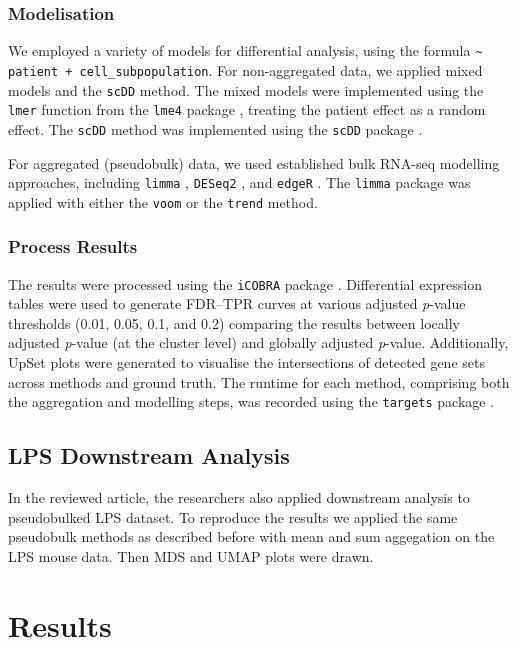 \documentclass[a4paper, 11pt, twocolumn]{article}
\begin{document}
\begin{multicols}{2}
\subsubsection{Modelisation}

We employed a variety of models for differential analysis, using the formula \texttt{\textasciitilde{} patient + cell\_subpopulation}. For non-aggregated data, we applied mixed models and the \texttt{scDD} method. The mixed models were implemented using the \texttt{lmer} function from the \texttt{lme4} package \citep{lme4}, treating the patient effect as a random effect. The \texttt{scDD} method was implemented using the \texttt{scDD} package \citep{scdd}.

For aggregated (pseudobulk) data, we used established bulk RNA-seq modelling approaches, including \texttt{limma} \citep{limma}, \texttt{DESeq2} \citep{deseq2}, and \texttt{edgeR} \citep{edger}. The \texttt{limma} package was applied with either the \texttt{voom} or the \texttt{trend} method.

\subsubsection{Process Results}

The results were processed using the \texttt{iCOBRA} package \citep{icobra}. Differential expression tables were used to generate FDR–TPR curves at various adjusted \textit{p}-value thresholds (0.01, 0.05, 0.1, and 0.2) comparing the results between locally adjusted \textit{p}-value (at the cluster level) and globally adjusted \textit{p}-value. Additionally, UpSet plots were generated to visualise the intersections of detected gene sets across methods and ground truth. The runtime for each method, comprising both the aggregation and modelling steps, was recorded using the \texttt{targets} package \citep{targets}.

\subsection{LPS Downstream Analysis}

In the reviewed article, the researchers also applied downstream analysis to pseudobulked LPS dataset. To reproduce the results we applied the same pseudobulk methods as described before with mean and sum aggegation on the LPS mouse data. Then MDS and UMAP plots were drawn.
\section{Results}


\end{multicols}
\end{document}

